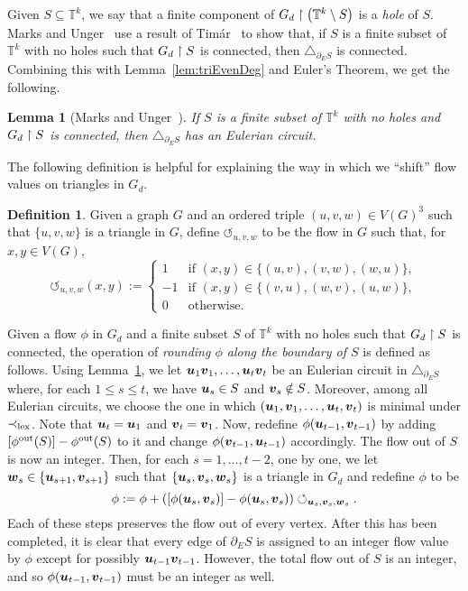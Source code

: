 \documentclass[12pt,a4paper]{amsart}
\numberwithin{equation}{section}
\newtheorem{lemma}[equation]{Lemma}
\theoremstyle{definition}
\newtheorem{defn}[equation]{Definition}
\begin{document}
Given $S\subseteq \mathbb{T}^k$, we say that a finite component of $G_d\upharpoonright\left(\mathbb{T}^k\setminus S\right)$ is a \emph{hole} of $S$. Marks and Unger~\cite[Proof of Lemma~5.6]{MarksUnger17} use a result of Tim\'ar~\cite{Timar13} to show that, if $S$ is a finite subset of $\mathbb{T}^k$ with no holes such that $G_d\upharpoonright S$ is connected, then $\triangle_{\partial_E S}$ is connected. Combining this with Lemma~\ref{lem:triEvenDeg} and Euler's Theorem, we get the following.

\begin{lemma}[Marks and Unger~{\cite[Lemma~5.6]{MarksUnger17}}]
\label{lem:triEuler}
If $S$ is a finite subset of $\mathbb{T}^k$ with no holes and $G_d\upharpoonright S$ is connected, then $\triangle_{\partial_E S}$ has an Eulerian circuit. 
\end{lemma}

The following definition is helpful for explaining the way in which we ``shift'' flow values on triangles in $G_d$. 

\begin{defn}
Given a graph $G$ and an ordered triple $(u,v,w)\in V(G)^3$ such that $\{u,v,w\}$ is a triangle in $G$, define $\circlearrowleft_{u,v,w}$ to be the flow in $G$ such that, for $x,y\in V(G)$,
\[\circlearrowleft_{u,v,w}(x,y):=\begin{cases} 1 & \text{if }(x,y)\in \{(u,v),(v,w),(w,u)\},\\
-1 & \text{if }(x,y)\in \{(v,u),(w,v),(u,w)\},\\
0 & \text{otherwise}.
\end{cases}\]
\end{defn}

Given a flow $\phi$ in $G_d$ and a finite subset $S$ of $\mathbb{T}^k$ with no holes such that $G_d\upharpoonright S$ is connected, the operation of \emph{rounding $\phi$ along the boundary of $S$} is defined as follows. Using Lemma~\ref{lem:triEuler}, we let $\boldsymbol{u}_1\boldsymbol{v}_1,\dots, \boldsymbol{u}_t\boldsymbol{v}_t$ be an Eulerian circuit in $\triangle_{\partial_ES}$ where, for each $1\leq s\leq t$, we have $\boldsymbol{u}_s\in S$ and $\boldsymbol{v}_s\notin S$. Moreover, among all Eulerian circuits, we choose the one in which $(\boldsymbol{u}_1,\boldsymbol{v}_1,\dots,\boldsymbol{u}_t,\boldsymbol{v}_t)$ is minimal under $\prec_{\operatorname{lex}}$. Note that $\boldsymbol{u}_t=\boldsymbol{u}_1$ and $\boldsymbol{v}_t=\boldsymbol{v}_1$. Now, redefine $\phi(\boldsymbol{u}_{t-1},\boldsymbol{v}_{t-1})$ by adding $[\phi^{\operatorname{out}}(S)]-\phi^{\operatorname{out}}(S)$ to it and change $\phi(\boldsymbol{v}_{t-1},\boldsymbol{u}_{t-1})$ accordingly. The flow out of $S$ is now an integer. Then, for each $s=1,\dots,t-2$, one by one, we let $\boldsymbol{w}_s\in\{\boldsymbol{u}_{s+1},\boldsymbol{v}_{s+1}\}$ such that $\{\boldsymbol{u}_s,\boldsymbol{v}_s,\boldsymbol{w}_s\}$ is a triangle in $G_d$ and redefine $\phi$ to be
\[\phi:= \phi + \left(\left[ \phi(\boldsymbol{u}_s,\boldsymbol{v}_s)\right] - \phi(\boldsymbol{u}_s,\boldsymbol{v}_s)\right)\circlearrowleft_{\boldsymbol{u}_s,\boldsymbol{v}_s,\boldsymbol{w}_s}.\]
Each of these steps preserves the flow out of every vertex. After this has been completed, it is clear that every edge of $\partial_ES$ is assigned to an integer flow value by $\phi$ except for possibly $\boldsymbol{u}_{t-1}\boldsymbol{v}_{t-1}$. However, the total flow out of $S$  is an integer, and so $\phi(\boldsymbol{u}_{t-1},\boldsymbol{v}_{t-1})$ must be an integer as well. 
\end{document}
